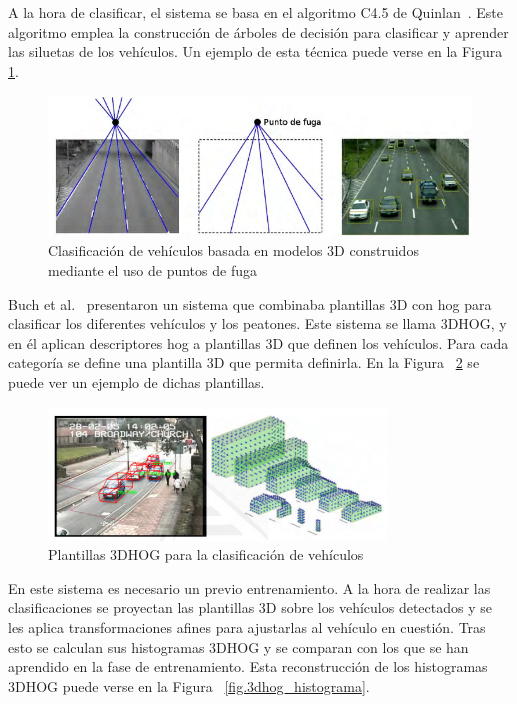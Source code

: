 A la hora de clasificar, el sistema se basa en el algoritmo C4.5 de Quinlan~\cite{c4_5}. Este algoritmo emplea la construcción de árboles de decisión para clasificar y aprender las siluetas de los vehículos. Un ejemplo de esta técnica puede verse en la Figura \ref{fig.c4_5}.

\begin{figure}[H]
  \begin{center}
    \includegraphics[width=1\textwidth]{figures/Estado_arte/c4_5.png}
		\caption{Clasificación de vehículos basada en modelos 3D construidos mediante el uso de puntos de fuga}
		\label{fig.c4_5}
		\end{center}
\end{figure}

Buch et al.~\cite{3dhog_article} presentaron un sistema que combinaba plantillas 3D con \acrshort{hog} para clasificar los diferentes vehículos y los peatones. Este sistema se llama 3DHOG, y en él aplican descriptores \acrshort{hog} a plantillas 3D que definen los vehículos. Para cada categoría se define una plantilla 3D que permita definirla. En la Figura ~\ref{fig.3dhog} se puede ver un ejemplo de dichas plantillas.

\begin{figure}[H]
  \begin{center}
    \includegraphics[width=0.8\textwidth]{figures/Estado_arte/3dhog.png}
		\caption{Plantillas 3DHOG para la clasificación de vehículos}
		\label{fig.3dhog}
		\end{center}
\end{figure}

En este sistema es necesario un previo entrenamiento. A la hora de realizar las clasificaciones se proyectan las plantillas 3D sobre los vehículos detectados y se les aplica transformaciones afines para ajustarlas al vehículo en cuestión. Tras esto se calculan sus histogramas 3DHOG y se comparan con los que se han aprendido en la fase de entrenamiento. Esta reconstrucción de los histogramas 3DHOG puede verse en la Figura ~\ref{fig.3dhog_histograma}.

